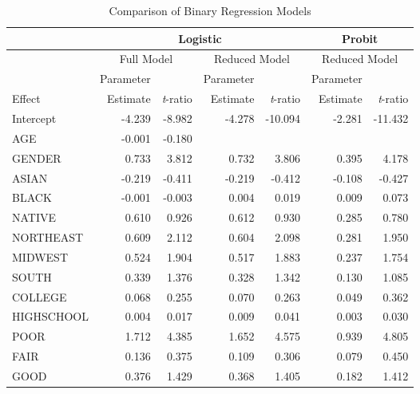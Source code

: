 \begin{table}[h]\begin{center}
\caption{\label{T11:MEPSBinaryModels} Comparison of Binary
Regression Models}
\begin{tabular}{l|rr|rr|rr}
\hline & \multicolumn{4}{|c|}{Logistic} &
\multicolumn{2}{|c}{Probit} \\ \hline & \multicolumn{2}{|c|}{Full
Model} & \multicolumn{2}{|c|}{Reduced Model} &
\multicolumn{2}{|c}{Reduced Model} \\ \cline{2-7}
& Parameter &  & Parameter &  & Parameter &  \\
Effect & Estimate & \textit{t}-ratio & Estimate & \textit{t}-ratio &
Estimate & \textit{t}-ratio \\ \hline
 Intercept &     -4.239 &     -8.982 &     -4.278 &    -10.094 &     -2.281 &    -11.432 \\
       AGE &     -0.001 &     -0.180 &            &            &            &            \\
    GENDER &      0.733 &      3.812 &      0.732 &      3.806 &      0.395 &      4.178 \\
     ASIAN &     -0.219 &     -0.411 &     -0.219 &     -0.412 &     -0.108 &     -0.427 \\
     BLACK &     -0.001 &     -0.003 &      0.004 &      0.019 &      0.009 &      0.073 \\
    NATIVE &      0.610 &      0.926 &      0.612 &      0.930 &      0.285 &      0.780 \\
 NORTHEAST &      0.609 &      2.112 &      0.604 &      2.098 &      0.281 &      1.950 \\
   MIDWEST &      0.524 &      1.904 &      0.517 &      1.883 &      0.237 &      1.754 \\
     SOUTH &      0.339 &      1.376 &      0.328 &      1.342 &      0.130 &      1.085 \\ \hline
   COLLEGE &      0.068 &      0.255 &      0.070 &      0.263 &      0.049 &      0.362 \\
HIGHSCHOOL &      0.004 &      0.017 &      0.009 &      0.041 &
0.003 &      0.030 \\ \hline
      POOR &      1.712 &      4.385 &      1.652 &      4.575 &      0.939 &      4.805 \\
      FAIR &      0.136 &      0.375 &      0.109 &      0.306 &      0.079 &      0.450 \\
      GOOD &      0.376 &      1.429 &      0.368 &      1.405 &      0.182 &      1.412 \\

\end{tabular}
\end{center}
\end{table}
